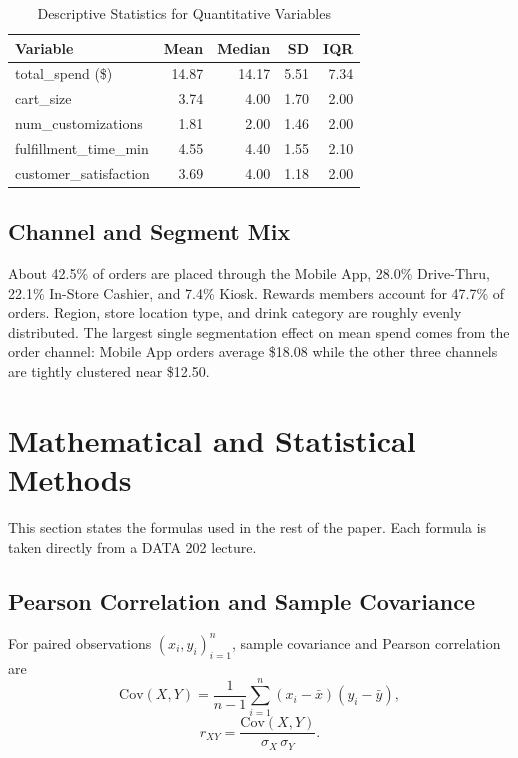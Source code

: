 \documentclass[conference,10pt]{IEEEtran}
\begin{document}
\begin{table}[!t]
\caption{Descriptive Statistics for Quantitative Variables}
\label{tab:desc}
\centering
\renewcommand{\arraystretch}{1.1}
\begin{tabular}{lrrrr}
\toprule
Variable & Mean & Median & SD & IQR \\
\midrule
total\_spend (\$)        & 14.87 & 14.17 & 5.51 & 7.34 \\
cart\_size               & 3.74  & 4.00  & 1.70 & 2.00 \\
num\_customizations      & 1.81  & 2.00  & 1.46 & 2.00 \\
fulfillment\_time\_min   & 4.55  & 4.40  & 1.55 & 2.10 \\
customer\_satisfaction   & 3.69  & 4.00  & 1.18 & 2.00 \\
\bottomrule
\end{tabular}
\end{table}

\subsection{Channel and Segment Mix}
About 42.5\% of orders are placed through the Mobile App, 28.0\% Drive\nobreakdash-Thru, 22.1\% In\nobreakdash-Store Cashier, and 7.4\% Kiosk. Rewards members account for 47.7\% of orders. Region, store location type, and drink category are roughly evenly distributed. The largest single segmentation effect on mean spend comes from the order channel: Mobile App orders average \$18.08 while the other three channels are tightly clustered near \$12.50.

\section{Mathematical and Statistical Methods}

This section states the formulas used in the rest of the paper. Each formula is taken directly from a DATA 202 lecture.

\subsection{Pearson Correlation and Sample Covariance}
For paired observations $(x_i, y_i)_{i=1}^{n}$, sample covariance and Pearson correlation are
\begin{equation}
\mathrm{Cov}(X,Y) = \frac{1}{n-1}\sum_{i=1}^{n}(x_i-\bar{x})(y_i-\bar{y}),
\label{eq:cov}
\end{equation}
\begin{equation}
r_{XY} = \frac{\mathrm{Cov}(X,Y)}{\sigma_X\,\sigma_Y}.
\label{eq:pearson}
\end{equation}
\end{document}

